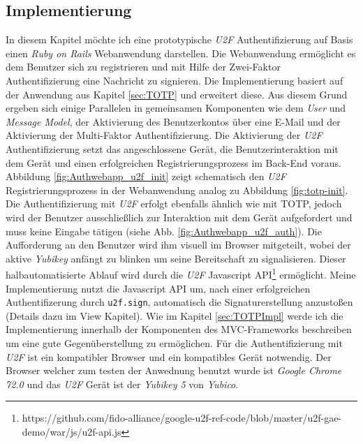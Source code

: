 \documentclass[11pt,a4paper,ngerman]{scrreprt}
\begin{document}
\subsection{Implementierung}\label{sec:u2fImpl}
In diesem Kapitel möchte ich eine prototypische \textit{U2F} Authentifizierung auf Basis einen \textit{Ruby on Rails} Webanwendung darstellen. Die Webanwendung ermöglicht es dem Benutzer sich zu registrieren und mit Hilfe der Zwei-Faktor Authentifizierung eine Nachricht zu signieren. Die Implementierung basiert auf der Anwendung aus Kapitel \ref{sec:TOTP} und erweitert diese. Aus diesem Grund ergeben sich einige Parallelen in gemeinsamen Komponenten wie dem \textit{User} und \textit{Message Model}, der Aktivierung des Benutzerkontos über eine E-Mail und der Aktivierung der Multi-Faktor Authentifizierung. Die Aktivierung der \textit{U2F} Authentifizierung setzt das angeschlossene Gerät, die Benutzerinteraktion mit dem Gerät und einen erfolgreichen Registrierungsprozess im Back-End voraus. Abbildung \ref{fig:Authwebapp_u2f_init} zeigt schematisch den \textit{U2F} Registrierungsprozess in der Webanwendung analog zu Abbildung \ref{fig:totp-init}. Die Authentifizierung mit \textit{U2F} erfolgt ebenfalls ähnlich wie mit TOTP, jedoch wird der Benutzer ausschließlich zur Interaktion mit dem Gerät aufgefordert und muss keine Eingabe tätigen (siehe Abb. \ref{fig:Authwebapp_u2f_auth}). Die Aufforderung an den Benutzer wird ihm visuell im Browser mitgeteilt, wobei der aktive \textit{Yubikey} anfängt zu blinken um seine Bereitschaft zu signalisieren. Dieser halbautomatisierte Ablauf wird durch die \textit{U2F} Javascript API\footnote{https://github.com/fido-alliance/google-u2f-ref-code/blob/master/u2f-gae-demo/war/js/u2f-api.js} ermöglicht. Meine Implementierung nutzt die Javascript API um, nach einer erfolgreichen Authentifizerung durch \texttt{u2f.sign}, automatisch die Signaturerstellung anzustoßen (Details dazu im View Kapitel). Wie im Kapitel \ref{sec:TOTPImpl} werde ich die Implementierung innerhalb der Komponenten des MVC-Frameworks beschreiben um eine gute Gegenüberstellung zu ermöglichen. Für die Authentifizierung mit \textit{U2F} ist ein kompatibler Browser und ein kompatibles Gerät notwendig. Der Browser welcher zum testen der Anwednung benutzt wurde ist \textit{Google Chrome 72.0} und das \textit{U2F} Gerät ist der \textit{Yubikey 5} von \textit{Yubico}.
\end{document}
